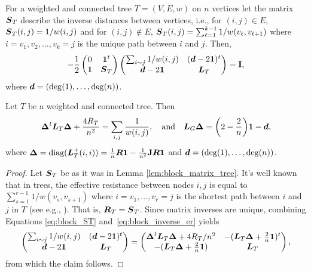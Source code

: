 \begin{lemma}
	\label{lem:block_matrix_tree}
 For a weighted and connected tree $T=(V,E,w)$ on $n$ vertices let the matrix $\vb*{S}_T$ describe the inverse distances  between vertices, i.e., for $(i,j)\in E$, $\vb*{S}_T(i,j) = 1/w(i,j)$ and for $(i,j)\notin E$, $\vb*{S}_T(i,j) = \sum_{\ell=1}^{k-1} 1/w(v_\ell,v_{\ell+1})$ where $i=v_1,v_2,\dots,v_k=j$ is the unique path between $i$ and $j$. Then,
 \begin{equation}
 \label{eq:block_ST}
-\frac{1}{2} \begin{pmatrix}
0 & \vb{1}^t \\
\vb{1} & \vb*{S}_T 
\end{pmatrix}
\begin{pmatrix}
\sum_{i\sim j}1/w(i,j)  & (\vb*{d}-2\vb{1})^t \\
\vb*{d}-2\vb{1} & \vb*{L}_T
\end{pmatrix} = \vb{I},
 \end{equation}
 where  $\vb*{d}=(\deg(1),\dots,\deg(n))$. 
\end{lemma}

\begin{corollary}
	Let $T$  be a weighted and connected tree. Then 
	\begin{equation*}
	\vb*{\Delta}^t \vb*{L}_T\vb*{\Delta} + \frac{4R_T}{n^2} = \sum_{i,j}  \frac{1}{w(i,j)}, \quad \text{and}\quad \vb*{L}_G\vb*{\Delta} = \bigg(2-\frac{2}{n}\bigg)\vb{1} - \vb*{d},
	\end{equation*}
	where $\vb*{\Delta} = \text{diag}(\vb*{L}_T^+(i,i))=\frac{1}{n}\vb*{R}\vb{1} - \frac{1}{n^2} \vb{J} \vb*{R}\vb{1}$ and $\vb*{d}= (\deg(1),\dots,\deg(n))$. 
\end{corollary}
\begin{proof}
	Let $\vb*{S}_T$ be as it was in  Lemma \ref{lem:block_matrix_tree}. It's well known  that in trees, the effective resistance between nodes $i,j$  is equal to $\sum_{s=1}^{r-1} 1/w(v_s,v_{s+1})$ where $i=v_1,\dots,v_r=j$ is the shortest path between $i$ and $j$ in $T$ (see e.g., \cite{ellens2011effective}). That is, $\vb*{R}_T=\vb*{S}_T$. Since matrix inverses are unique, combining Equations \eqref{eq:block_ST} and~\eqref{eq:block_inverse_er} yields 
	\begin{equation*}
	\begin{pmatrix}
	\sum_{i\sim j}1/w(i,j)  & (\vb*{d}-2\vb{1})^t \\
	\vb*{d}-2\vb{1} & \vb*{L}_T
	\end{pmatrix} = \begin{pmatrix}
	\vb*{\Delta}^t  \vb*{L}_T \vb*{\Delta}  + 4R_T/n^2
	&  -(\vb*{L}_T\vb*{\Delta} + \frac{2}{n}\vb{1} )^t \\
	-(\vb*{L}_T\vb*{\Delta} + \frac{2}{n}\vb{1} ) 
	& \vb*{L}_T
	\end{pmatrix},
	\end{equation*}  
	from which the claim follows. 
\end{proof}







